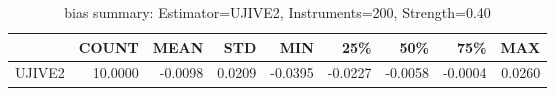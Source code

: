 \begin{table}[ht]
\centering
\caption{bias summary: Estimator=UJIVE2, Instruments=200, Strength=0.40}
\begin{tabular}{lrrrrrrrr}
\toprule
 & COUNT & MEAN & STD & MIN & 25\% & 50\% & 75\% & MAX \\
\midrule
UJIVE2 & 10.0000 & -0.0098 & 0.0209 & -0.0395 & -0.0227 & -0.0058 & -0.0004 & 0.0260 \\
\bottomrule
\end{tabular}
\end{table}

